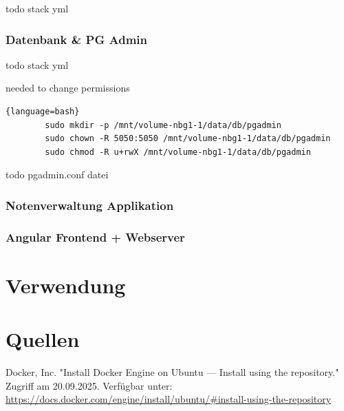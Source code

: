 \documentclass[11pt]{article}
\begin{document}
    todo stack yml

    \subsubsection{Datenbank \& PG Admin}

    todo stack yml

    needed to change permissions


    \begin{lstlisting}{language=bash}
        sudo mkdir -p /mnt/volume-nbg1-1/data/db/pgadmin
        sudo chown -R 5050:5050 /mnt/volume-nbg1-1/data/db/pgadmin
        sudo chmod -R u+rwX /mnt/volume-nbg1-1/data/db/pgadmin
    \end{lstlisting}

    todo pgadmin.conf datei

    \subsubsection{Notenverwaltung Applikation}

    \subsubsection{Angular Frontend + Webserver}


    \section{Verwendung}


    \section*{Quellen}
    \begin{thebibliography}{9}
        Docker, Inc. "Install Docker Engine on Ubuntu — Install using the repository." Zugriff am 20.09.2025. Verfügbar unter: \url{https://docs.docker.com/engine/install/ubuntu/#install-using-the-repository}
    \end{thebibliography}
\end{document}
